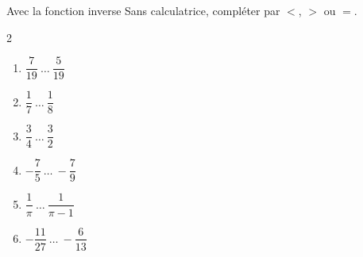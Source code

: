 \begin{exo}{Avec la fonction inverse}
	Sans calculatrice, compléter par $<$, $>$ ou $=$.
	\vspace*{-2mm}
	\begin{multicols}{2}
		\begin{enumerate}[itemsep=2mm]
			\item $\dfrac{7}{19} \ \dots \ \dfrac{5}{19}$
			\item $\dfrac{1}{7} \ \dots \ \dfrac{1}{8}$
			\item $\dfrac{3}{4} \ \dots \ \dfrac{3}{2}$
			\item $-\dfrac{7}{5} \ \dots \ -\dfrac{7}{9}$
			\item $\dfrac{1}{\pi} \ \dots \ \dfrac{1}{\pi - 1}$
			\item $-\dfrac{11}{27} \ \dots \ -\dfrac{6}{13}$
		\end{enumerate}
	\end{multicols}\vspace*{-2mm}
\end{exo}
